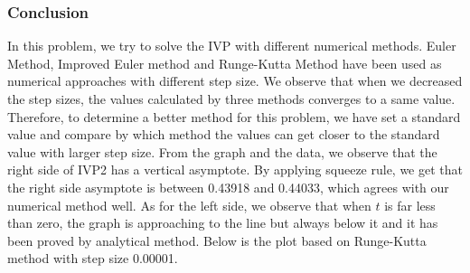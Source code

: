 \documentclass[11pt,a4paper]{article}
\begin{document}
\subsubsection{Conclusion}

In this problem, we try to solve the IVP with different numerical methods. Euler Method, Improved Euler method and Runge-Kutta Method have been used as numerical approaches with different step size. We observe that when we decreased the step sizes, the values calculated by three methods converges to a same value. Therefore, to determine a better method for this problem, we have set a standard value and compare by which method the values can get closer to the standard value with larger step size. 
From the graph and the data, we observe that the right side of IVP2 has a vertical asymptote. By applying squeeze rule, we get that the right side asymptote is between 0.43918 and 0.44033, which agrees with our numerical method well. As for the left side, we observe that when $t$ is far less than zero, the graph is approaching to the line but always below it and it has been proved by analytical method. 
Below is the plot based on Runge-Kutta method with step size 0.00001. 
\end{document}
